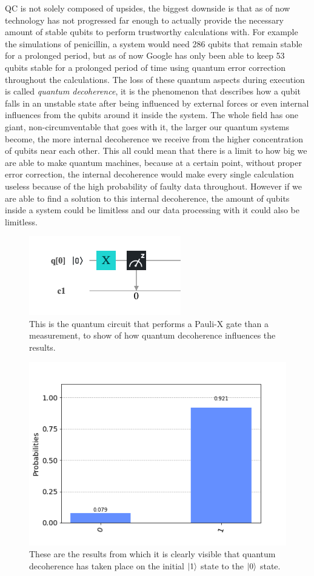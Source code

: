 QC is not solely composed of upsides, the biggest downside is that as of now technology has not progressed far enough to actually provide the necessary amount of stable qubits to perform trustworthy calculations with. For example the simulations of penicillin, a system would need 286 qubits that remain stable for a prolonged period, but as of now  Google has only been able to keep 53 qubits stable for a prolonged period of time using quantum error correction throughout the calculations. The loss of these quantum aspects during execution is called \textit{quantum decoherence}, it is the phenomenon that describes how a qubit falls in an unstable state after being influenced by external forces or even internal influences from the qubits around it inside the system. The whole field has one giant, non-circumventable that goes with it, the larger our quantum systems become, the more internal decoherence we receive from the higher concentration of qubits near each other. This all could mean that there is a limit to how big we are able to make quantum machines, because at a certain point, without proper error correction, the internal decoherence would make every single calculation useless because of the high probability of faulty data throughout. However if we are able to find a solution to this internal decoherence, the amount of qubits inside a system could be limitless and our data processing with it could also be limitless.

\begin{figure}[h]
	\centering
	\includegraphics[scale = 0.75]{../Demonstration/img/Quantum_decoherence_circuit.PNG}
	\caption{This is the quantum circuit that performs a Pauli-X gate than a measurement, to show of how quantum decoherence influences the results.}
\end{figure}

\begin{figure}[h]
	\centering
	\includegraphics[scale = 0.75]{../Demonstration/img/Quantum_decoherence_graph.PNG}
	\caption{These are the results from which it is clearly visible that quantum decoherence has taken place on the initial $\ket{1}$ state to the $\ket{0}$ state.}
\end{figure}





